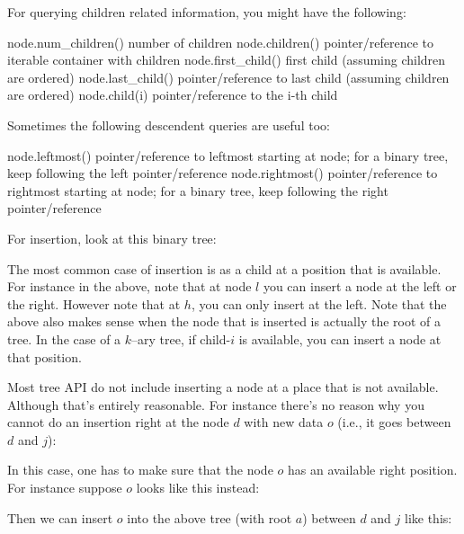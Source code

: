 For querying children related information, you might have the
following:
\begin{console}
node.num_children()      number of children
node.children()          pointer/reference to iterable
                         container with children
node.first_child()       first child (assuming children 
                         are ordered)
node.last_child()        pointer/reference to last child 
                         (assuming children are ordered)
node.child(i)            pointer/reference to the i-th 
                         child
\end{console}
Sometimes the following descendent queries are useful too:
\begin{console}
node.leftmost()          pointer/reference to leftmost
                         starting at node; for a binary
                         tree, keep following the left
                         pointer/reference
node.rightmost()         pointer/reference to rightmost
                         starting at node; for a binary
                         tree, keep following the right
                         pointer/reference
\end{console}

For insertion, look at this binary tree:



The most common case of insertion is as a child at a position that
is available.
For instance in the above, note that at node $l$ 
you can insert a node at the left or the right.
However note that at $h$, you can only insert at the left.
Note that the above also makes sense when the node that is
inserted is actually the root of a tree.
In the case of a $k$--ary tree, 
if child-$i$ is available, you can insert a node at that 
position.

Most tree API do not include inserting a node at a place that is not available.
Although that's entirely reasonable.
For instance there's no reason why you cannot do an insertion
right at the node $d$ with new data $o$ (i.e., it goes
between $d$ and $j$):



In this case, one has to make sure that the node $o$
has an available right position.
For instance suppose $o$ looks like this instead:



Then we can insert $o$ into the above tree (with root $a$) 
between $d$ and $j$ like this:

